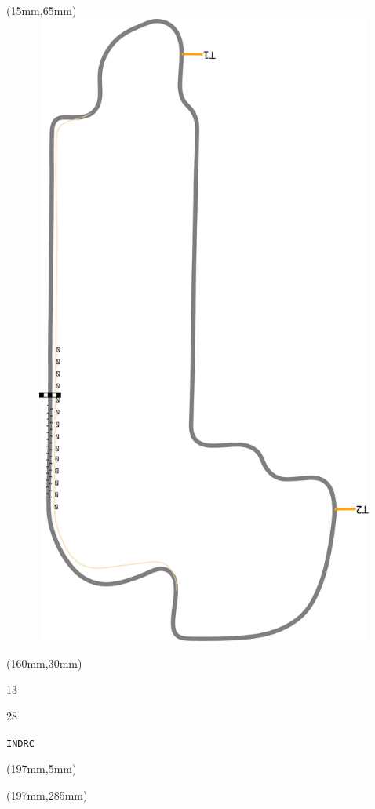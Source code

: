 \begin{textblock*}{185mm}(15mm,65mm)%
\centering
\mbox{\includegraphics[width=185mm,height=210mm,keepaspectratio]{PT/INDRC.pdf}}
\end{textblock*}
\begin{textblock*}{40mm}(160mm,30mm)%
\Large
\par{} 
\par13 
\par28 
\par\hfill\tiny\tt INDRC\\
\end{textblock*}
\begin{textblock*}{20mm}(197mm,5mm)%
\fbox{\thepage}
\label{INDRC}
\end{textblock*}
\begin{textblock*}{20mm}(197mm,285mm)%
\fbox{\thepage}
\end{textblock*}


